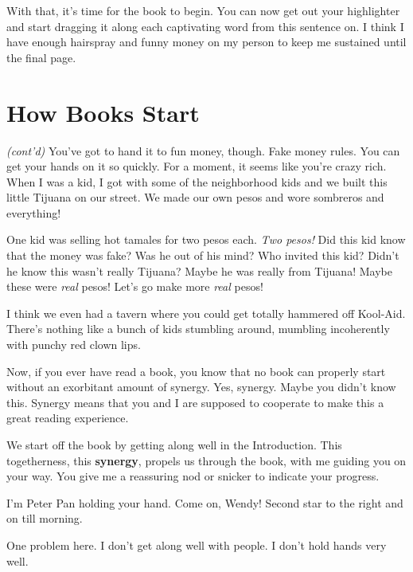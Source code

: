 \documentclass[10pt,twoside]{report}
\begin{document}
With that, it's time for the book to begin.  You can now get out your
highlighter and start dragging it along each captivating word from
this sentence on.  I think I have enough hairspray and funny money on
my person to keep me sustained until the final page.
	
\section{How Books Start}

	\begin{sidebar}
	\textit{(cont'd)} You've got to hand it to fun money, though. Fake money rules. You can get your hands on it so quickly. For a moment, it seems like you're crazy rich. When I was a kid, I got with some of the neighborhood kids and we built this little Tijuana on our street. We made our own pesos and wore sombreros and everything!\vspace{6pt}
	
	One kid was selling hot tamales for two pesos each. \textit{Two pesos!} Did this kid know that the money was fake? Was he out of his mind? Who invited this kid? Didn't he know this wasn't really Tijuana? Maybe he was really from Tijuana! Maybe these were \textit{real} pesos! Let's go make more \textit{real} pesos!\vspace{6pt}
	
	I think we even had a tavern where you could get totally hammered off Kool-Aid. There's nothing like a bunch of kids stumbling around, mumbling incoherently with punchy red clown lips.
	\end{sidebar}

Now, if you ever have read a book, you know that no book can properly
start without an exorbitant amount of synergy.  Yes, synergy.  Maybe
you didn't know this.  Synergy means that you and I are supposed to
cooperate to make this a great reading experience.

We start off the book by getting along well in the Introduction.  This
togetherness, this {\bf synergy}, propels us through the book, with me
guiding you on your way.  You give me a reassuring nod or snicker to
indicate your progress.

I'm Peter Pan holding your hand.  Come on, Wendy!  Second star to the
right and on till morning.

One problem here.  I don't get along well with people.  I don't hold
hands very well.
\end{document}
